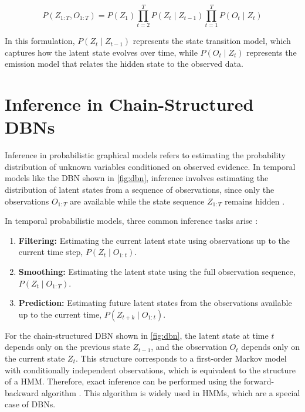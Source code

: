 \begin{equation}
P(Z_{1:T}, O_{1:T}) =
P(Z_1)
\prod_{t=2}^{T} P(Z_t \mid Z_{t-1})
\prod_{t=1}^{T} P(O_t \mid Z_t)
\label{eq:dbn_factorization}
\end{equation}

\par In this formulation, $P(Z_t \mid Z_{t-1})$ represents the state transition model, which captures how the latent state evolves over time, 
while $P(O_t \mid Z_t)$ represents the emission model that relates the hidden state to the observed data.






\section{Inference in Chain-Structured DBNs}
\label{sec:inference_chain_dbn}
Inference in probabilistic graphical models refers to estimating the probability distribution of unknown variables conditioned on observed evidence. 
In temporal models like the \ac{DBN} shown in \autoref{fig:dbn}, inference involves estimating the distribution of latent states from a sequence of observations, since only the observations $O_{1:T}$ are available while the state sequence $Z_{1:T}$ remains hidden \cite{pml1Book,koller2009probabilistic}.

\par In temporal probabilistic models, three common inference tasks arise \cite{Murphy2012MachineL}:
\begin{enumerate}
    \item \textbf{Filtering:} Estimating the current latent state using observations up to the current time step, $P(Z_t \mid O_{1:t})$.
    \item \textbf{Smoothing:} Estimating the latent state using the full observation sequence, $P(Z_t \mid O_{1:T})$.
    \item \textbf{Prediction:} Estimating future latent states from the observations available up to the current time, $P(Z_{t+k} \mid O_{1:t})$.
\end{enumerate}


\par For the chain-structured \ac{DBN} shown in \autoref{fig:dbn}, the latent state at time $t$ depends only on the previous state $Z_{t-1}$, and the observation $O_t$ depends only on the current state $Z_t$. 
This structure corresponds to a first-order Markov model with conditionally independent observations, which is equivalent to the structure of a \ac{HMM}. 
Therefore, exact inference can be performed using the forward-backward algorithm \cite{rabiner1989tutorial}. 
This algorithm is widely used in \acp{HMM}, which are a special case of \acp{DBN}.



